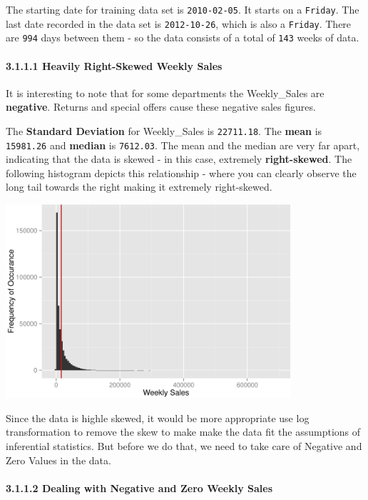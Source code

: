 \documentclass[]{article}
\begin{document}
The starting date for training data set is \texttt{2010-02-05}. It
starts on a \texttt{Friday}. The last date recorded in the data set is
\texttt{2012-10-26}, which is also a \texttt{Friday}. There are
\texttt{994} days between them - so the data consists of a total of
\texttt{143} weeks of data.

\paragraph{3.1.1.1 Heavily Right-Skewed Weekly
Sales}\label{heavily-right-skewed-weekly-sales}

It is interesting to note that for some departments the Weekly\_Sales
are \textbf{negative}. Returns and special offers cause these negative
sales figures.

The \textbf{Standard Deviation} for Weekly\_Sales is \texttt{22711.18}.
The \textbf{mean} is \texttt{15981.26} and \textbf{median} is
\texttt{7612.03}. The mean and the median are very far apart, indicating
that the data is skewed - in this case, extremely \textbf{right-skewed}.
The following histogram depicts this relationship - where you can
clearly observe the long tail towards the right making it extremely
right-skewed.

\includegraphics[width=400px]{PredictingWeeklySalesAtWalmart_files/figure-latex/weeklySalesSkew-1}

Since the data is highle skewed, it would be more appropriate use log
transformation to remove the skew to make make the data fit the
assumptions of inferential statistics. But before we do that, we need to
take care of Negative and Zero Values in the data.

\paragraph{3.1.1.2 Dealing with Negative and Zero Weekly
Sales}\label{dealing-with-negative-and-zero-weekly-sales}
\end{document}
